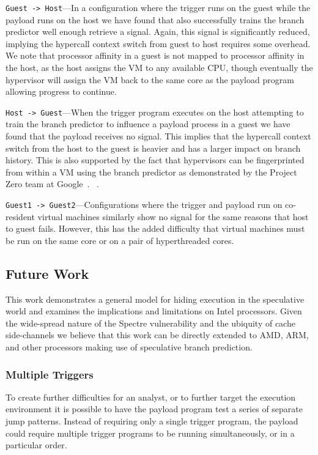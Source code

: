 \texttt{Guest -> Host}---In a configuration where the trigger runs on the guest
while the payload runs on the host we have found that \speculake also
successfully trains the branch predictor well enough retrieve a signal. Again,
this signal is significantly reduced, implying the hypercall context switch from
guest to host requires some overhead. We note that processor affinity in a guest
is not mapped to processor affinity in the host, as the host assigns the VM to
any available CPU, though eventually the hypervisor will assign the VM back to
the same core as the payload program allowing progress to continue.

\texttt{Host -> Guest}---When the trigger program executes on the host
attempting to train the
branch predictor to influence a payload process in a guest we have found that
the payload receives no signal. This implies that the hypercall context switch
from the host to the guest is heavier and has a larger impact on branch history.
This is also supported by the fact that hypervisors can be fingerprinted from 
within a VM using the branch predictor as demonstrated by the Project Zero 
team at Google~\cite{}.
~\cite{project_zero}.

\texttt{Guest1 -> Guest2}---Configurations where the trigger and payload run on
co-resident virtual machines similarly show no signal for the same reasons that
host to guest \speculake fails. However, this has the added difficulty that
virtual machines must be run on the same core or on a pair of hyperthreaded
cores.




\subsection{Future Work}
\label{subsec:future-work}

This work demonstrates a general model for hiding execution in 
the speculative world and examines the implications and limitations on 
Intel processors. Given the wide-spread nature of the Spectre vulnerability 
and the ubiquity of cache side-channels we believe that this work can 
be directly extended to AMD, ARM, and other processors making use of
speculative branch prediction.

\subsubsection{Multiple Triggers}
To create further difficulties for an analyst, or to further target the
execution environment it is possible to have the payload program test a series
of separate jump patterns. Instead of requiring only a single trigger program,
the payload could require multiple trigger programs to be running
simultaneously, or in a particular order.

